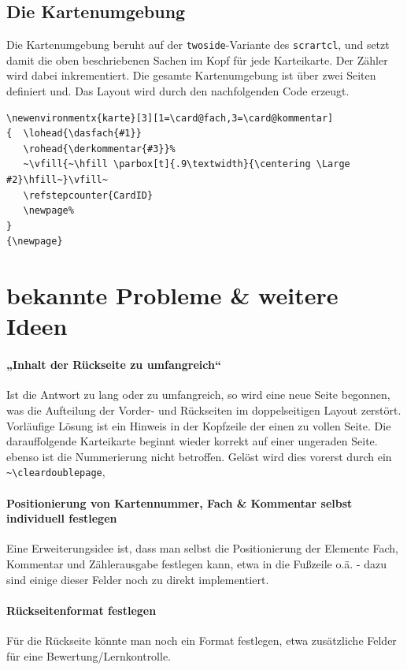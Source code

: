 \documentclass[a4paper,DIV=calc]{scrartcl}
\begin{document}
\subsection{Die Kartenumgebung}
Die Kartenumgebung beruht auf der \lstinline!twoside!-Variante des \lstinline!scrartcl!, und setzt damit die oben beschriebenen Sachen im Kopf für jede Karteikarte. Der Zähler wird dabei inkrementiert. Die gesamte Kartenumgebung ist über zwei Seiten definiert und. Das Layout wird durch den nachfolgenden Code erzeugt.
\begin{lstlisting}[title=Die Kartenumgebung,float=h]
\newenvironmentx{karte}[3][1=\card@fach,3=\card@kommentar]
{  \lohead{\dasfach{#1}}
   \rohead{\derkommentar{#3}}%
   ~\vfill{~\hfill \parbox[t]{.9\textwidth}{\centering \Large #2}\hfill~}\vfill~
   \refstepcounter{CardID}
   \newpage%
}
{\newpage}
\end{lstlisting}
%
%
%
\section{bekannte Probleme \& weitere Ideen}
\paragraph{„Inhalt der Rückseite zu umfangreich“} %
Ist die Antwort zu lang oder zu umfangreich, so wird eine neue Seite begonnen, was die Aufteilung der Vorder- und Rückseiten im doppelseitigen Layout zerstört. Vorläufige Lösung ist ein Hinweis in der Kopfzeile der einen zu vollen Seite. Die darauffolgende Karteikarte beginnt wieder korrekt auf einer ungeraden Seite. ebenso ist die Nummerierung nicht betroffen. Gelöst wird dies vorerst durch ein \lstinline!~\cleardoublepage!, 

\paragraph{Positionierung von Kartennummer, Fach \& Kommentar selbst individuell festlegen}
Eine Erweiterungsidee ist, dass man selbst die Positionierung der Elemente Fach, Kommentar und Zählerausgabe festlegen kann, etwa in die Fußzeile o.ä. - dazu sind einige dieser Felder noch zu direkt implementiert.

\paragraph{Rückseitenformat festlegen} 
Für die Rückseite könnte man noch ein Format festlegen, etwa zusätzliche Felder für eine Bewertung/Lernkontrolle.
\end{document}

